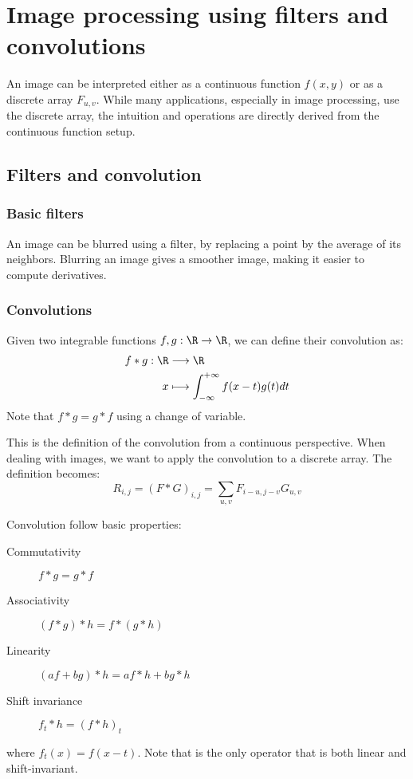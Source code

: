 \section{Image processing using filters and convolutions}
An image can be interpreted either as a continuous function $f(x, y)$ or as a discrete array $F_{u,v}$. While many applications, especially in image processing, use the discrete array, the intuition and operations are directly derived from the continuous function setup.

\subsection{Filters and convolution}
\subsubsection{Basic filters}
An image can be blurred using a filter, by replacing a point by the average of its neighbors. Blurring an image gives a smoother image, making it easier to compute derivatives. 


\subsubsection{Convolutions}
Given two integrable functions $f, g:\R\to\R$, we can define their convolution as:
\begin{align*}
    f*g: \R&\longrightarrow \R\\
    x&\longmapsto\int_{-\infty}^{+\infty}f(x-t)g(t)dt
\end{align*}
Note that $f*g=g*f$ using a change of variable.

This is the definition of the convolution from a continuous perspective. When dealing with images, we want to apply the convolution to a discrete array. The definition becomes:
\begin{equation*}
    R_{i,j} = (F*G)_{i,j} = \sum_{u,v} F_{i-u, j-v}G_{u,v}
\end{equation*}


Convolution follow basic properties:
\begin{description}
    \item[Commutativity] $f*g=g*f$
    \item[Associativity] $(f*g)*h = f*(g*h)$
    \item[Linearity] $(af+bg)*h = af*h + bg*h$
    \item[Shift invariance] $f_t * h = (f*h)_t$
\end{description}
where $f_t(x) = f(x-t)$.
Note that is the only operator that is both linear and shift-invariant.


